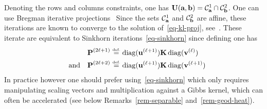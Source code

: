 \begin{rem}\label{rem-iterative-projection}
Denoting 
the rows and columns constraints, one has $\CouplingsD(\a,\b) = \Cc^1_\a \cap \Cc^2_\b$. One can use Bregman iterative projections~\cite{bregman1967relaxation}
Since the sets $\Cc^1_\a$ and $\Cc^2_\b$ are affine, these iterations are known to converge to the solution of~\eqref{eq-kl-proj}, see~\cite{bregman1967relaxation}. These iterate are equivalent to Sinkhorn iterations~\eqref{eq-sinkhorn} since defining 
\eq{\label{eq-sink-matrix}\P^{(2\ell)} \eqdef \diag(\it{\uD}) \K \diag(\it{\vD}),}
one has
\begin{align*}
	\P^{(2\ell+1)} &\eqdef \diag(\itt{\uD}) \K \diag(\it{\vD}) \\
	\qandq
	\P^{(2\ell+2)} &\eqdef \diag(\itt{\uD}) \K \diag(\itt{\vD})
\end{align*}
In practice however one should prefer using~\eqref{eq-sinkhorn} which only requires manipulating scaling vectors and multiplication against a Gibbs kernel, which can often be accelerated (see below Remarks~\ref{rem-separable} and~\ref{rem-geod-heat}). 
\end{rem}



